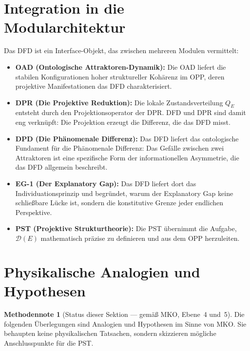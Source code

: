 \documentclass[11pt,a4paper]{article}
\theoremstyle{plain}
\theoremstyle{definition}
\newtheorem{methodennote}{Methodennote}[section]
\begin{document}
\section{Integration in die Modularchitektur}

Das DFD ist ein Interface-Objekt, das zwischen mehreren Modulen vermittelt:

\begin{itemize}
  \item \textbf{OAD (Ontologische Attraktoren-Dynamik):} Die OAD liefert die stabilen
        Konfigurationen hoher struktureller Koh\"{a}renz im OPP, deren projektive
        Manifestationen das DFD charakterisiert.
  \item \textbf{DPR (Die Projektive Reduktion):} Die lokale Zustandsverteilung $Q_E$
        entsteht durch den Projektionsoperator der DPR. DFD und DPR sind damit eng
        verkn\"{u}pft: Die Projektion erzeugt die Differenz, die das DFD misst.
  \item \textbf{DPD (Die Ph\"{a}nomenale Differenz):} Das DFD liefert das
        ontologische Fundament f\"{u}r die Ph\"{a}nomenale Differenz: Das Gef\"{a}lle
        zwischen zwei Attraktoren ist eine spezifische Form der informationellen
        Asymmetrie, die das DFD allgemein beschreibt.
  \item \textbf{EG-1 (Der Explanatory Gap):} Das DFD liefert dort das
        Individuationsprinzip und begr\"{u}ndet, warum der Explanatory Gap keine
        schlie\ss{}bare L\"{u}cke ist, sondern die konstitutive Grenze jeder endlichen
        Perspektive.
  \item \textbf{PST (Projektive Strukturtheorie):} Die PST \"{u}bernimmt die Aufgabe,
        $\mathcal{D}(E)$ mathematisch pr\"{a}zise zu definieren und aus dem OPP
        herzuleiten.
\end{itemize}

\section{Physikalische Analogien und Hypothesen}

\begin{methodennote}[Status dieser Sektion --- gem\"{a}\ss{} MKO, Ebene~4 und~5]
Die folgenden \"{U}berlegungen sind Analogien und Hypothesen im Sinne von MKO. Sie
behaupten keine physikalischen Tatsachen, sondern skizzieren m\"{o}gliche
Anschlusspunkte f\"{u}r die PST.
\end{methodennote}
\end{document}
